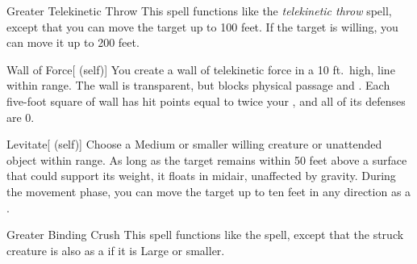 \lowercase{\hypertarget{spell:Greater Telekinetic Throw}{}}\label{spell:Greater Telekinetic Throw}
\begin{apability}[\nth{3}]{\hypertarget{spell:Greater Telekinetic Throw}{Greater Telekinetic Throw}}
This spell functions like the \textit{telekinetic throw} spell, except that you can move the target up to 100 feet.
If the target is willing, you can move it up to 200 feet.
\end{apability}
\vspace{0.25em}



\lowercase{\hypertarget{spell:Wall of Force}{}}\label{spell:Wall of Force}
\begin{attuneability}[\nth{3}]{\hypertarget{spell:Wall of Force}{Wall of Force}}[ (self)]
You create a wall of telekinetic force in a 10 ft.\ high, \arealarge line within \rngmed range.
The wall is transparent, but blocks physical passage and .
Each five-foot square of wall has hit points equal to twice your , and all of its defenses are 0.
\end{attuneability}
\vspace{0.25em}



\lowercase{\hypertarget{spell:Levitate}{}}\label{spell:Levitate}
\begin{attuneability}[\nth{4}]{\hypertarget{spell:Levitate}{Levitate}}[ (self)]
Choose a Medium or smaller willing creature or unattended object within \rngclose range.
As long as the target remains within 50 feet above a surface that could support its weight, it floats in midair, unaffected by gravity.
During the movement phase, you can move the target up to ten feet in any direction as a .
\end{attuneability}
\vspace{0.25em}



\lowercase{\hypertarget{spell:Greater Binding Crush}{}}\label{spell:Greater Binding Crush}
\begin{apability}[\nth{5}]{\hypertarget{spell:Greater Binding Crush}{Greater Binding Crush}}
This spell functions like the  spell, except that the struck creature is also  as a  if it is Large or smaller.
\end{apability}
\vspace{0.25em}



